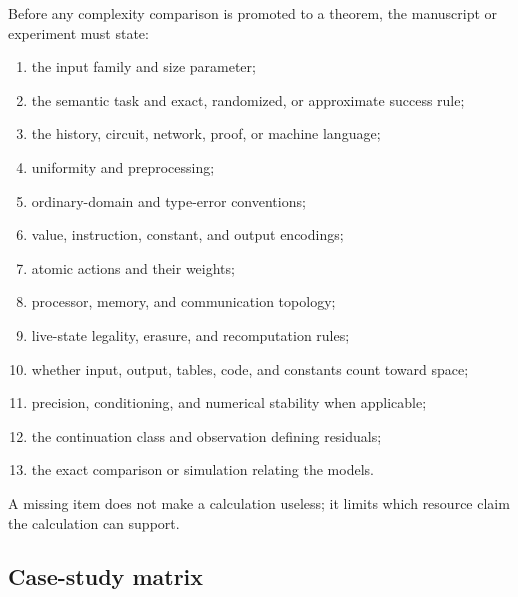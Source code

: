 Before any complexity comparison is promoted to a theorem, the manuscript or
experiment must state:

\begin{enumerate}
  \item the input family and size parameter;
  \item the semantic task and exact, randomized, or approximate success rule;
  \item the history, circuit, network, proof, or machine language;
  \item uniformity and preprocessing;
  \item ordinary-domain and type-error conventions;
  \item value, instruction, constant, and output encodings;
  \item atomic actions and their weights;
  \item processor, memory, and communication topology;
  \item live-state legality, erasure, and recomputation rules;
  \item whether input, output, tables, code, and constants count toward space;
  \item precision, conditioning, and numerical stability when applicable;
  \item the continuation class and observation defining residuals;
  \item the exact comparison or simulation relating the models.
\end{enumerate}

A missing item does not make a calculation useless; it limits which resource
claim the calculation can support.

\subsection{Case-study matrix}

